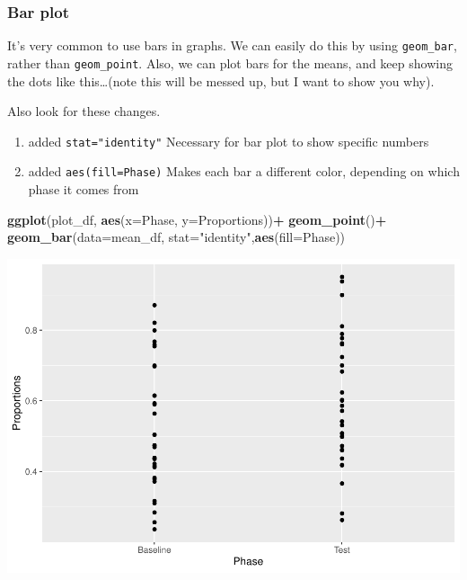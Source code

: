 \documentclass[]{book}
\newenvironment{Shaded}{\begin{snugshade}}{\end{snugshade}}
\newcommand{\KeywordTok}[1]{\textcolor[rgb]{0.13,0.29,0.53}{\textbf{#1}}}
\newcommand{\DataTypeTok}[1]{\textcolor[rgb]{0.13,0.29,0.53}{#1}}
\newcommand{\StringTok}[1]{\textcolor[rgb]{0.31,0.60,0.02}{#1}}
\newcommand{\OperatorTok}[1]{\textcolor[rgb]{0.81,0.36,0.00}{\textbf{#1}}}
\newcommand{\NormalTok}[1]{#1}
\providecommand{\tightlist}{%
  \setlength{\itemsep}{0pt}\setlength{\parskip}{0pt}}
\begin{document}
\subsubsection{Bar plot}\label{bar-plot}

It's very common to use bars in graphs. We can easily do this by using
\texttt{geom\_bar}, rather than \texttt{geom\_point}. Also, we can plot
bars for the means, and keep showing the dots like this\ldots{}(note
this will be messed up, but I want to show you why).

Also look for these changes.

\begin{enumerate}
\def\labelenumi{\arabic{enumi}.}
\tightlist
\item
  added \texttt{stat="identity"} Necessary for bar plot to show specific
  numbers
\item
  added \texttt{aes(fill=Phase)} Makes each bar a different color,
  depending on which phase it comes from
\end{enumerate}

\begin{Shaded}
\begin{Highlighting}[]
\KeywordTok{ggplot}\NormalTok{(plot_df, }\KeywordTok{aes}\NormalTok{(}\DataTypeTok{x=}\NormalTok{Phase, }\DataTypeTok{y=}\NormalTok{Proportions))}\OperatorTok{+}\StringTok{ }
\StringTok{  }\KeywordTok{geom_point}\NormalTok{()}\OperatorTok{+}
\StringTok{  }\KeywordTok{geom_bar}\NormalTok{(}\DataTypeTok{data=}\NormalTok{mean_df, }\DataTypeTok{stat=}\StringTok{"identity"}\NormalTok{,}\KeywordTok{aes}\NormalTok{(}\DataTypeTok{fill=}\NormalTok{Phase))}
\end{Highlighting}
\end{Shaded}

\includegraphics{Statistics_Lab_files/figure-latex/unnamed-chunk-175-1.pdf}
\end{document}
